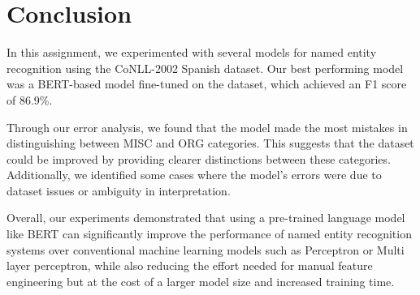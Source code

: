 \documentclass[12pt]{report}
\begin{document}
\pagebreak
\section*{Conclusion}

In this assignment, we experimented with several models for named entity recognition using the CoNLL-2002 Spanish dataset. Our best performing model was a BERT-based model fine-tuned on the dataset, which achieved an F1 score of 86.9\%.

Through our error analysis, we found that the model made the most mistakes in distinguishing between MISC and ORG categories. This suggests that the dataset could be improved by providing clearer distinctions between these categories. Additionally, we identified some cases where the model's errors were due to dataset issues or ambiguity in interpretation.

Overall, our experiments demonstrated that using a pre-trained language model like BERT can significantly improve the performance of named entity recognition systems over conventional machine learning models such as Perceptron or Multi layer perceptron, while also reducing the effort needed for manual feature engineering but at the cost of a larger model size and increased training time.
\end{document}
